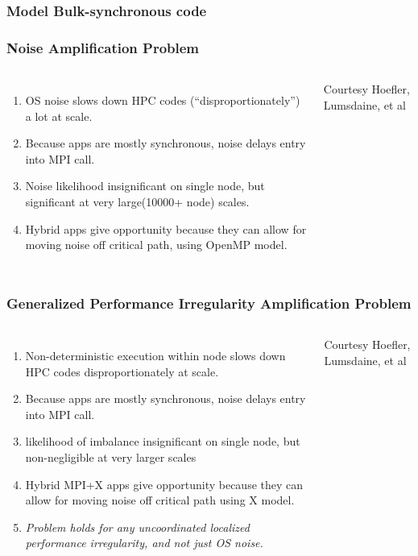 \begin{frame}
\frametitle{Model Bulk-synchronous code}
\end{frame}

\begin{frame}
\frametitle{Noise Amplification Problem}
\begin{columns}
\begin{enumerate}
\item \tiny OS noise slows down HPC codes (``disproportionately'') a lot at scale.
\item \tiny Because apps are mostly synchronous, noise delays entry into MPI call.
\item \tiny Noise likelihood insignificant on single node, but significant at very large(10000+ node) scales.
\item \tiny Hybrid apps give opportunity because they can allow for moving noise off critical path, using OpenMP model.
\end{enumerate}
\begin{center}
\small Courtesy Hoefler, Lumsdaine, et al
\end{center}
\end{columns}
\end{frame}

\begin{frame}
\frametitle{Generalized  Performance Irregularity Amplification Problem}
\begin{columns}
\begin{enumerate}
\item \tiny Non-deterministic execution within node slows down HPC codes disproportionately at scale.
\item \tiny Because apps are mostly synchronous, noise delays entry into MPI call.
\item \tiny likelihood of imbalance insignificant on single node, but non-negligible at very larger scales
\item \tiny Hybrid MPI+X apps give opportunity because they can allow for moving noise off critical path using X model.
\item \tiny \textit{Problem holds for any uncoordinated localized performance irregularity, and not just OS noise.}
\end{enumerate}
\begin{center}
\small Courtesy Hoefler, Lumsdaine, et al
\end{center}
\end{columns}
\end{frame}


